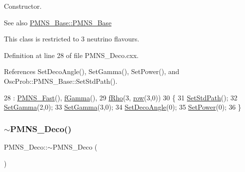 Constructor. \begin{DoxySeeAlso}{See also}
\hyperlink{classOscProb_1_1PMNS__Base_aa53e83b03a9cf4bdfa0a07136bd17a79}{P\+M\+N\+S\+\_\+\+Base\+::\+P\+M\+N\+S\+\_\+\+Base}
\end{DoxySeeAlso}
This class is restricted to 3 neutrino flavours. 

Definition at line 28 of file P\+M\+N\+S\+\_\+\+Deco.\+cxx.



References Set\+Deco\+Angle(), Set\+Gamma(), Set\+Power(), and Osc\+Prob\+::\+P\+M\+N\+S\+\_\+\+Base\+::\+Set\+Std\+Path().


\begin{DoxyCode}
28                      : \hyperlink{classOscProb_1_1PMNS__Fast_a2bbac744bf63753105d766a860af7c0d}{PMNS\_Fast}(), \hyperlink{classOscProb_1_1PMNS__Deco_ae2f30ac9f8b25344959f1698616d337a}{fGamma}(),
29 \hyperlink{classOscProb_1_1PMNS__Deco_a0488d62b4ef4cf5b43425769f5fcdbdf}{fRho}(3, \hyperlink{classOscProb_1_1PMNS__Deco_a34634741bc68bc1c524cf47f44e7f5b6}{row}(3,0))
30 \{
31   \hyperlink{classOscProb_1_1PMNS__Base_add6533a9fc9acdfc7ae258b62570d78d}{SetStdPath}();
32   \hyperlink{classOscProb_1_1PMNS__Deco_ac06a9c503d1c5b4a43c4eb797881898d}{SetGamma}(2,0);
33   \hyperlink{classOscProb_1_1PMNS__Deco_ac06a9c503d1c5b4a43c4eb797881898d}{SetGamma}(3,0);
34   \hyperlink{classOscProb_1_1PMNS__Deco_a35e79054682aa88c55f4350c29336014}{SetDecoAngle}(0);
35   \hyperlink{classOscProb_1_1PMNS__Deco_afe7b8b9ae438d8b207bf75c2cfbb9fb8}{SetPower}(0);
36 \}
\end{DoxyCode}
\mbox{\label{classOscProb_1_1PMNS__Deco_a5539610ab44c510c204ae884fb8e2a0e}} 
\subsubsection{\texorpdfstring{$\sim$\+P\+M\+N\+S\+\_\+\+Deco()}{~PMNS\_Deco()}}
{\footnotesize\ttfamily P\+M\+N\+S\+\_\+\+Deco\+::$\sim$\+P\+M\+N\+S\+\_\+\+Deco (\begin{DoxyParamCaption}{ }\end{DoxyParamCaption})\hspace{0.3cm}{\ttfamily [virtual]}}

